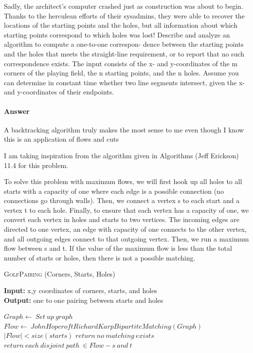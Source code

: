 \documentclass{article}
\begin{document}
Sadly, the architect’s computer crashed just as construction was about to
begin. Thanks to the herculean efforts of their sysadmins, they were able to
recover the locations of the starting points and the holes, but all information
about which starting points correspond to which holes was lost!
Describe and analyze an algorithm to compute a one-to-one correspon-
dence between the starting points and the holes that meets the straight-line
requirement, or to report that no such correspondence exists. The input
consists of the x- and y-coordinates of the m corners of the playing field, the
n starting points, and the n holes. Assume you can determine in constant
time whether two line segments intersect, given the x- and y-coordinates
of their endpoints.

\paragraph{Answer}

A backtracking algorithm truly makes the most sense to me even though I know this
is an application of flows and cuts

I am taking inspiration from the algorithm given in Algorithms (Jeff Erickson) 11.4 for this problem.

To solve this problem with maximum flows, we will first hook up all holes to all starts
with a capacity of one where each edge is a possible connection (no connections go through walls). Then, we connect a vertex s to each start and a vertex t to each hole. Finally, to ensure that each vertex has a capacity of one, we convert each vertex in holes and starts to two vertices. The incoming edges are directed to one vertex, an edge with capacity of one connects to the other vertex, and all outgoing edges connect to that outgoing vertex. Then, we run a maximum flow between s and t. If the value of the maximum flow is less than the total number of starts or holes, then there is not a possible matching.

\begin{algorithm} \caption{\textsc{GolfPairing} (Corners, Starts, Holes)}\label{alg:seb}
    {\bf Input:} x,y coordinates of corners, starts, and holes\\
    {\bf Output:} one to one pairing between starts and holes
    \begin{algorithmic}[1]
        \State$Graph \gets\ Set\ up\ graph$
	\State$Flow \gets\ JohnHopcroftRichardKarpBipartiteMatching(Graph)$
	\If$|Flow| < size(starts)$
		\State$return\ no\ matching\ exists$
	\EndIf{}
	\State$return\ each\ disjoint\ path\ \in Flow - s\ and\ t$
    \end{algorithmic}
\end{algorithm}
\end{document}
